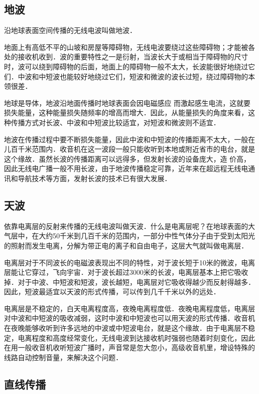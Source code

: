 \subsection{地波}

沿地球表面空间传播的无线电波叫做地波．

地面上有高低不平的山坡和房屋等障碍物，无线电波要绕过这些障碍物；才能被各处的接收机收到．波的重要特性之一是衍射，当波长大于或相当于障碍物的尺寸时，波可以绕到障碍物的后面，地面上的障碍物一般不太大，长波能很好地绕过它们．中波和中短波也能较好地绕过它们，短波和微波的波长过短，绕过障碍物的本领很差．

地球是导体，地波沿地面传播时地球表面会因电磁感应
而激起感生电流，这就要损失能量，这种能量损失随频率的增高而增大．因此，从能量损失的角度来看，这种传播方式对长波、中波和中短波比较适宜，对短波和微波则不适宜．

地波在传播过程中要不断损失能量，因此中波和中短波的传播距离不太大，一般在儿百千米范围内．收音机在这一波段一般只能收听到本地或附近省市的电台，就是这个缘故．虽然长波的传播距离可以远得多，但发射长波的设备庞大，造
价高，因此无线电广播一般不用长波，由于地波传播稳定可靠，近年来在超远程无线电通讯和导航技术等方面，发射长波的技术已有很大发展．

\subsection{天波}

依靠电离层的反射来传播的无线电波叫做天波．什么是电离层呢？在地球表面的大气层中，在大约50千米到几百千米的范围内，一部分中性气体分子由于受到太阳光的照射而发生电离，分解为带正电的离子和自由电子，这层大气就叫做电离层．

电离层对于不同波长的电磁波表现出不同的特性，对于波长短于10米的微波，电离层能让它穿过，飞向宇宙．对于波长超过3000米的长波，电离层基本上把它吸收掉．对于中波、中短波和短波，波长越短，电离层对它吸收得越少而反射得越多．因此，短波最适宜以天波的形式传播，可以传到几千千米以外的远处．

电离层是不稳定的，白天电离程度高，夜晚电离程度低．夜晚电离程度低，电离层对中波和中短波的吸收减弱，这时中波和中短波也可以用天波的形式传播．收音机在夜晚能够收听到许多远地的中波或中短波电台，就是这个缘故．由于电离层不稳定，电离程度和高度经常变化，无线电波到达接收机时强弱也随着时刻变化，因此在用一般收音机收听短波广播时，声音常是忽大忽小，高级收音机里，增设特殊的线路自动控制音量，来解决这个问题．

\subsection{直线传播}

